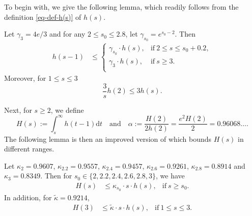 \documentclass[12pt]{amsart}
\begin{document}
To begin with, we give the following lemma, which readily follows from the definition \eqref{eq-def-h(s)} of $h(s)$.
\begin{lemma}\label{lem:hsm1}
    Let $\gamma_3=4e/3$ and for any $2\le s_0\le 2.8$, let $\gamma_{s_0}=e^{s_0-2}$. Then
    \begin{align}
        h(s-1)&\le
        \begin{cases}
            \gamma_{s_0}\cdot h(s),&\text{if}\ 2\le s\le s_0+0.2,\\
            \gamma_3\cdot h(s),&\text{if}\ s\ge 3.\\
        \end{cases}
        \label{eq:h11}
    \end{align}
    Moreover, for $1\le s\le 3$
    \begin{equation}
        \frac{3}{s}h(2)\le 3h(s).\label{eq:h12}
    \end{equation}
\end{lemma}
Next, for $s\ge 2$, we define
\begin{equation}
\label{eq:H11}
H(s):=\int_s^{\infty} h(t-1) \mathrm{d}t \quad\text{and} \quad\alpha:=\frac{H(2)}{2h(2)}=\frac{e^2H(2)}{2}=0.96068\ldots.
\end{equation}
The following lemma is then an improved version of \cite[Lemma 9.6]{Nathanson} which bounds $H(s)$ in different ranges.
\begin{lemma}
\label{lemma:forg}
Let $\kappa_{2} = 0.9607$, $\kappa_{2.2} = 0.9557$, $\kappa_{2.4} = 0.9457$, $\kappa_{2.6} = 0.9261$, $\kappa_{2.8} = 0.8914$ and $\kappa_3 = 0.8349$. Then for $s_0 \in \{2, 2.2, 2.4, 2.6, 2.8,3\}$, we have
\begin{align}
    H(s)&\le \kappa_{s_0}\cdot s\cdot h(s),&\text{if}\ s\ge s_0. \label{eq: H(s)-upper}
\end{align}
In addition, for $\tilde{\kappa}=0.9214$,
\begin{align}    
    H(3)&\le \tilde{\kappa}\cdot s\cdot h(s),&\text{if}\ 1\le s\le 3.\label{eq: H(3)-upper}
\end{align}
\end{lemma}
\end{document}
